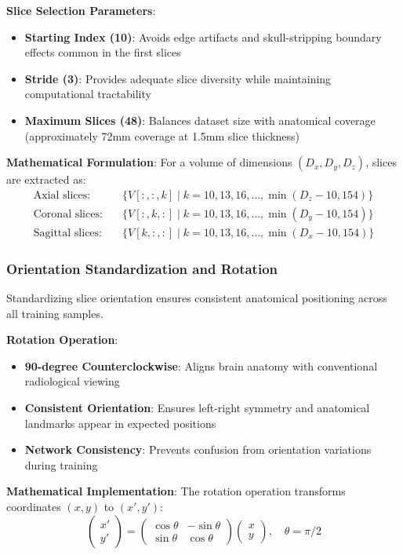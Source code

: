 \documentclass[12pt,a4paper]{article}
\begin{document}
\textbf{Slice Selection Parameters}:
\begin{itemize}
    \item \textbf{Starting Index (10)}: Avoids edge artifacts and skull-stripping boundary effects common in the first slices
    \item \textbf{Stride (3)}: Provides adequate slice diversity while maintaining computational tractability
    \item \textbf{Maximum Slices (48)}: Balances dataset size with anatomical coverage (approximately 72mm coverage at 1.5mm slice thickness)
\end{itemize}

\textbf{Mathematical Formulation}:
For a volume of dimensions $(D_x, D_y, D_z)$, slices are extracted as:
\begin{align}
\text{Axial slices}: & \quad \{V[:, :, k] \mid k = 10, 13, 16, \dots, \min(D_z-10, 154)\} \\
\text{Coronal slices}: & \quad \{V[:, k, :] \mid k = 10, 13, 16, \dots, \min(D_y-10, 154)\} \\
\text{Sagittal slices}: & \quad \{V[k, :, :] \mid k = 10, 13, 16, \dots, \min(D_x-10, 154)\}
\end{align}

\subsubsection{Orientation Standardization and Rotation}

Standardizing slice orientation ensures consistent anatomical positioning across all training samples.

\textbf{Rotation Operation}:
\begin{itemize}
    \item \textbf{90-degree Counterclockwise}: Aligns brain anatomy with conventional radiological viewing
    \item \textbf{Consistent Orientation}: Ensures left-right symmetry and anatomical landmarks appear in expected positions
    \item \textbf{Network Consistency}: Prevents confusion from orientation variations during training
\end{itemize}

\textbf{Mathematical Implementation}:
The rotation operation transforms coordinates $(x, y)$ to $(x', y')$:
\begin{equation}
\begin{pmatrix} x' \\ y' \end{pmatrix} = \begin{pmatrix} \cos\theta & -\sin\theta \\ \sin\theta & \cos\theta \end{pmatrix} \begin{pmatrix} x \\ y \end{pmatrix}, \quad \theta = \pi/2
\end{equation}
\end{document}
